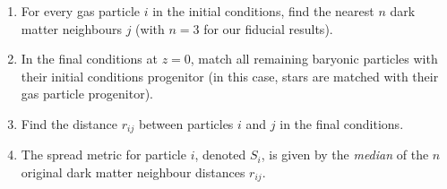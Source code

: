 \documentclass[fleqn,usenatbib]{mnras}
\begin{document}
\begin{enumerate} 
	\item For every gas particle $i$ in the initial conditions, find the nearest
          $n$ dark matter neighbours $j$ (with $n=3$ for our fiducial results).
	\item In the final conditions at $z=0$, match all remaining baryonic particles
	      with their initial conditions progenitor (in this case, stars are
	      matched with their gas particle progenitor).
    \item Find the distance $r_{ij}$ between particles $i$ and $j$ in the
          final conditions.
    \item The spread metric for particle $i$, denoted $S_{i}$, is given by the \emph{median}
          of the $n$ original dark matter neighbour distances $r_{ij}$.
\end{enumerate}
\end{document}
